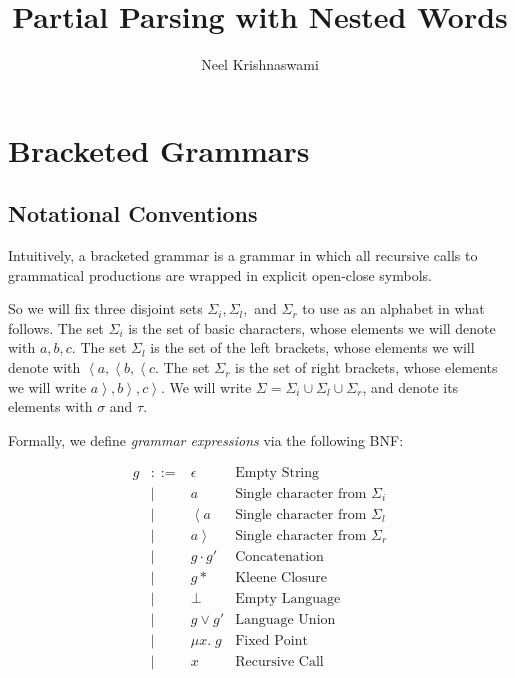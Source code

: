 \documentclass{article}
\author{Neel Krishnaswami}
\title{Partial Parsing with Nested Words}
\newcommand{\fix}[2]{\mu {#1}.\;{#2}}
\newcommand{\lft}[1]{\left<{#1}\right.}
\newcommand{\rgt}[1]{\left.{#1}\right>}
\begin{document}
\maketitle

\section{Bracketed Grammars}

\subsection{Notational Conventions}

Intuitively, a bracketed grammar is a grammar in which all recursive calls to
grammatical productions are wrapped in explicit open-close symbols.

So we will fix three disjoint sets $\Sigma_i, \Sigma_l,$ and $\Sigma_r$ to use
as an alphabet in what follows. The set $\Sigma_i$ is the set of basic
characters, whose elements we will denote with $a, b, c$.  The set $\Sigma_l$
is the set of the left brackets, whose elements we will denote with $\lft{a},
\lft{b}, \lft{c}$. The set $\Sigma_r$ is the set of right brackets, whose
elements we will write $\rgt{a}, \rgt{b}, \rgt{c}$. We will write $\Sigma =
\Sigma_i \cup \Sigma_l \cup \Sigma_r$, and denote its elements with $\sigma$
and $\tau$.

Formally, we define \emph{grammar expressions} via the following
BNF:

\begin{displaymath}
\begin{array}{lcll}
g & ::= & \epsilon   & \mbox{Empty String} \\
  &  |  & a          & \mbox{Single character from $\Sigma_i$} \\
  &  |  & \lft{a}    & \mbox{Single character from $\Sigma_l$} \\
  &  |  & \rgt{a}    & \mbox{Single character from $\Sigma_r$} \\
  &  |  & g \cdot g' & \mbox{Concatenation} \\ 
  &  |  & g*         & \mbox{Kleene Closure} \\
  &  |  & \bot       & \mbox{Empty Language} \\
  &  |  & g \vee g'  & \mbox{Language Union} \\
  &  |  & \fix{x}{g} & \mbox{Fixed Point} \\
  &  |  & x          & \mbox{Recursive Call} \\
\end{array}
\end{displaymath}
\end{document}
